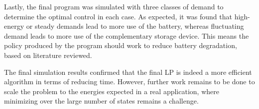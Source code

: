 \documentclass[conference]{IEEEtran}
\begin{document}
Lastly, the final program was simulated with three classes of demand to determine the optimal control in each case. As expected, it was found that high-energy or steady demands lead to more use of the battery, whereas fluctuating demand leads to more use of the complementary storage device. This means the policy produced by the program should work to reduce battery degradation, based on literature reviewed.

The final simulation results confirmed that the final LP is indeed a more efficient algorithm in terms of reducing time. However, further work remains to be done to scale the problem to the energies expected in a real application, where minimizing over the large number of states remains a challenge.

\printbibliography
\end{document}
